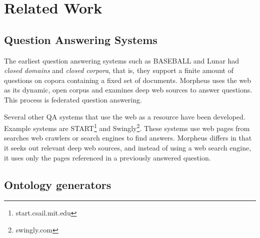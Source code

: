 \section{Related Work}
\label{sec:relatedwork}

\subsection{Question Answering Systems} 

The earliest question answering systems such as BASEBALL \cite{Green1961} and Lunar \cite{woods1973} had \emph{closed domains} and \emph{closed corpora}, that is, they support a finite amount of questions on copora containing a fixed set of documents. Morpheus uses the web as its dynamic, open corpus and examines deep web sources to answer questions.  This process is federated question answering.


Several other QA systems that use the web as a resource have been developed. Example systems are START\footnote{start.csail.mit.edu} and Swingly\footnote{swingly.com}.  These systems use web pages from searches web crawlers or search engines to find answers.  Morpheus differs in that it seeks out relevant deep web sources, and instead of using a web search engine, it uses only the pages referenced in a previously answered question.

\subsection{Ontology generators} 
\label{sec:ontology_generators}




